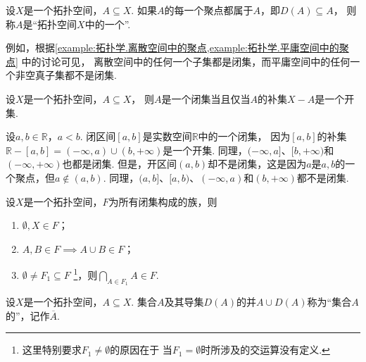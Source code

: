\begin{definition}\label{definition:拓扑学.闭集的概念}
设\(X\)是一个拓扑空间，\(A \subseteq X\).
如果\(A\)的每一个聚点都属于\(A\)，即\(D(A) \subseteq A\)，
则称\(A\)是“拓扑空间\(X\)中的一个”.
\end{definition}

例如，根据\cref{example:拓扑学.离散空间中的聚点,example:拓扑学.平庸空间中的聚点} 中的讨论可见，
离散空间中的任何一个子集都是闭集，而平庸空间中的任何一个非空真子集都不是闭集.

\begin{theorem}\label{theorem:拓扑学.成为闭集的充要条件1}
设\(X\)是一个拓扑空间，\(A \subseteq X\)，
则\(A\)是一个闭集当且仅当\(A\)的补集\(X - A\)是一个开集.
\end{theorem}

\begin{example}
设\(a,b\in\mathbb{R}\)，\(a<b\).
闭区间\([a,b]\)是实数空间\(\mathbb{R}\)中的一个闭集，
因为\([a,b]\)的补集\(\mathbb{R}-[a,b]
=(-\infty,a)\cup(b,+\infty)\)是一个开集.
同理，\((-\infty,a]\)、\([b,+\infty)\)和\((-\infty,+\infty)\)也都是闭集.
但是，开区间\((a,b)\)却不是闭集，这是因为\(a\)是\(a,b\)的一个聚点，但\(a\notin(a,b)\).
同理，\((a,b]\)、\([a,b)\)、\((-\infty,a)\)和\((b,+\infty)\)都不是闭集.
\end{example}

\begin{theorem}\label{theorem:拓扑学.闭集族的性质}
设\(X\)是一个拓扑空间，\(F\)为所有闭集构成的族，则
\begin{enumerate}
	\item \(\emptyset,X \in F\)；
	\item \(A,B \in F \implies A \cup B \in F\)；
	\item \(\emptyset \neq F_1 \subseteq F\)
	\footnote{%
		这里特别要求\(F_1 \neq \emptyset\)的原因在于
		当\(F_1 = \emptyset\)时所涉及的交运算没有定义.
	}，则\(\bigcap\limits_{A \in F_1} A \in F\).
\end{enumerate}
\end{theorem}

\begin{definition}\label{definition:拓扑学.闭包的概念}
设\(X\)是一个拓扑空间，\(A \subseteq X\).
集合\(A\)及其导集\(D(A)\)的并\(A \cup D(A)\)称为“集合\(A\)的”，记作\(\overline{A}\).
\end{definition}

